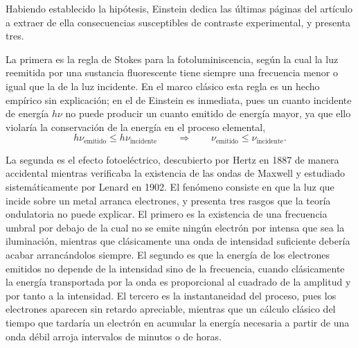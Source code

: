            Habiendo establecido la hipótesis, Einstein dedica las últimas páginas del artículo a extraer de ella consecuencias susceptibles de contraste experimental, y presenta tres.

            La primera es la regla de Stokes para la fotoluminiscencia, según la cual la luz reemitida por una sustancia fluorescente tiene siempre una frecuencia menor o igual que la de la luz incidente. En el marco clásico esta regla es un hecho empírico sin explicación; en el de Einstein es inmediata, pues un cuanto incidente de energía $h\nu$ no puede producir un cuanto emitido de energía mayor, ya que ello violaría la conservación de la energía en el proceso elemental,
            \begin{equation}\label{eq:Stokes}
                h\nu_{\text{emitido}} \leq h\nu_{\text{incidente}}
                \qquad\Longrightarrow\qquad
                \nu_{\text{emitido}} \leq \nu_{\text{incidente}} .
            \end{equation}

            La segunda es el efecto fotoeléctrico, descubierto por Hertz en 1887 de manera accidental mientras verificaba la existencia de las ondas de Maxwell y estudiado sistemáticamente por Lenard en 1902. El fenómeno consiste en que la luz que incide sobre un metal arranca electrones, y presenta tres rasgos que la teoría ondulatoria no puede explicar. El primero es la existencia de una frecuencia umbral por debajo de la cual no se emite ningún electrón por intensa que sea la iluminación, mientras que clásicamente una onda de intensidad suficiente debería acabar arrancándolos siempre. El segundo es que la energía de los electrones emitidos no depende de la intensidad sino de la frecuencia, cuando clásicamente la energía transportada por la onda es proporcional al cuadrado de la amplitud y por tanto a la intensidad. El tercero es la instantaneidad del proceso, pues los electrones aparecen sin retardo apreciable, mientras que un cálculo clásico del tiempo que tardaría un electrón en acumular la energía necesaria a partir de una onda débil arroja intervalos de minutos o de horas.

